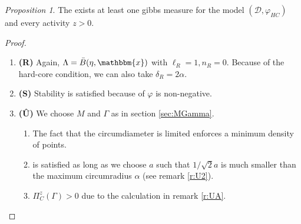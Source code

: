 \documentclass[12pt,a4paper]{article}
\theoremstyle{definition}
\theoremstyle{remark}
\theoremstyle{theorem}
\newtheorem{proposition}{Proposition}
\newcommand{\x}{\mathbbm{x}}
\begin{document}
\begin{proposition}
	The exists at least one gibbs measure for the model $(\mathcal D,\varphi_{HC})$ and every activity $z>0$.
\end{proposition}
\begin{proof}
\begin{enumerate}[]
	\item \textbf{(R)} Again, $\Lambda = \bar B(\eta,\x)$ with $\ell_R = 1, n_R = 0$. Because of the hard-core condition, we can also take $\delta_R = 2\alpha$.
	\item \textbf{(S)} Stability is satisfied because of $\varphi$ is non-negative.
	\item \textbf{(\^{U})} We choose $M$ and $\Gamma$ as in section \ref{sec:MGamma}.
		\begin{enumerate}[(\^{U}1)]
			\item {} The fact that the circumdiameter is limited enforces a minimum density of points.
			\item {} is satisfied as long as we choose $a$ such that $1/\sqrt{2} a$ is much smaller than the maximum circumradius $\alpha$ (see remark \ref{r:U2}).
			\item $\Pi^z_C(\Gamma)>0$ due to the calculation in remark \ref{r:UA}.
		\end{enumerate}
\end{enumerate}
\end{proof}
\end{document}
